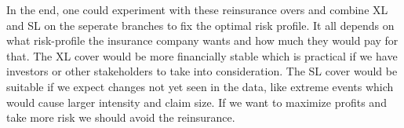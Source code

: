\documentclass[11pt]{article}
\begin{document}
In the end, one could experiment with these reinsurance overs and combine XL and SL on the seperate branches to fix the optimal risk profile.
It all depends on what risk-profile the insurance company wants and how much they would pay for that.
The XL cover would be more financially stable which is practical if we have investors or other stakeholders to take into consideration.
The SL cover would be suitable if we expect changes not yet seen in the data, like extreme events which would cause larger intensity and claim size.
If we want to maximize profits and take more risk we should avoid the reinsurance.


% 
\end{document}
